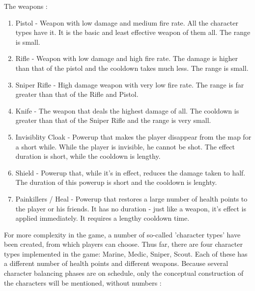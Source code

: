 The weapons : 
\begin{enumerate}
  \item Pistol - Weapon with low damage and medium fire rate. All the character
  types have it. It is the basic and least effective weapon of them all. The
  range is small.
  
  \item Rifle - Weapon with low damage and high fire rate. The damage is higher
  than that of the pistol and the cooldown takes much less. The range is small.
  
  \item Sniper Rifle - High damage weapon with very low fire rate. The range is
  far greater than that of the Rifle and Pistol.
  
  \item Knife - The weapon that deals the highest damage of all. The cooldown is
  greater than that of the Sniper Rifle and the range is very small.
   
  \item Invisiblity Cloak - Powerup that makes the player disappear from the
  map for a short while. While the player is invisible, he cannot be shot.
  The effect duration is short, while the cooldown is lengthy.
  
  \item Shield - Powerup that, while it's in effect, reduces the damage taken to
  half. The duration of this powerup is short and the cooldown is lenghty.
  
  \item Painkillers / Heal - Powerup that restores a large number of
  health points to the player or his friends. It has no duration - just like
  a weapon, it's effect is applied immediately. It requires a lengthy cooldown
  time.
  
\end{enumerate}

For more complexity in the game, a number of so-called 'character types' have
been created, from which players can choose. Thus far, there are four character
types implemented in the game: Marine, Medic, Sniper, Scout. Each of these has a
different number of health points and different weapons. Because several
character balancing phases are on schedule, only the conceptual construction of
the characters will be mentioned, without numbers :

